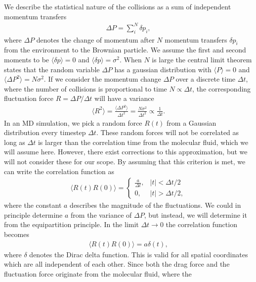 We describe the statistical nature of the collisions as a sum of
independent momentum transfers
\begin{align*}
  \Delta P = \sum_i^N \delta p_i,
\end{align*}
where $\Delta P$ denotes the change of momentum after $N$ momentum transfers
$\delta p_i$ from the environment to the Brownian particle. We assume the first
and second moments to be $\langle \delta p \rangle = 0$ and  $\langle \delta p \rangle
= \sigma^2$. When $N$ is large the central limit theorem states that the random
variable $\Delta P$ has a gaussian distribution with  $\langle P \rangle = 0$
and $\langle \Delta P^2 \rangle = N\sigma^2$. If we consider the momentum change
$\Delta P$ over a discrete time $\Delta t$, where the number of collisions is
proportional to time $N \propto \Delta t$, the corresponding fluctuation force
$R = \Delta P / \Delta t$ will have a variance 
\begin{align*}
  \langle R^2 \rangle = \frac{\langle \Delta P^2 \rangle}{\Delta t^2} = \frac{N \sigma^2}{\Delta t^2}  \propto \frac{1}{\Delta t}.
\end{align*}
In an \acrshort{MD} simulation, we pick a random force $R(t)$ from a Gaussian
distribution every timestep $\Delta t$. These random forces will not be correlated as long as $\Delta t$ is larger than the correlation time from the molecular fluid, which we will assume here. However, there exist corrections to this approximation, but we will not consider these for our scope. By assuming that this criterion is met, we can write the correlation function as 
\begin{align}
  \langle R(t) R(0) \rangle = 
  \begin{cases}
    \frac{a}{\Delta t}, & |t| < \Delta t/2 \\
    0, & |t| > \Delta t/2,
    \label{eq:disc_corr}
  \end{cases}
\end{align}
where the constant $a$ describes the magnitude of the fluctuations. We could in principle determine $a$ from the variance of $\Delta P$, but instead, we will determine it from the equipartition principle. In the limit $\Delta t \to 0$ the correlation function becomes
\begin{align}
  \langle R(t)R(0) \rangle = a \delta(t),
  \label{eq:F_corr}
\end{align}
where $\delta$ denotes the Dirac delta function. This is valid for all spatial
coordinates which are all independent of each other. Since both the drag
force and the fluctuation force originate from the molecular fluid, where the
